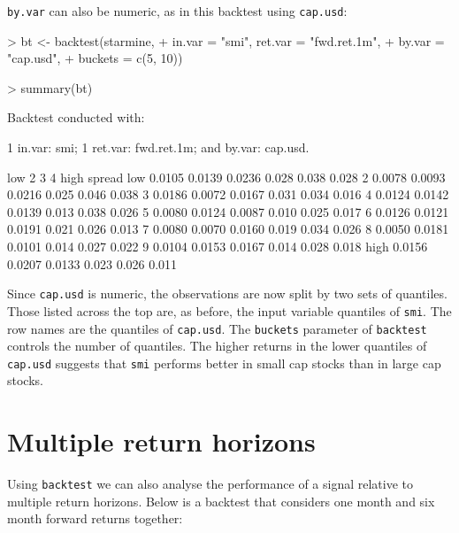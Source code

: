 \documentclass[a4paper]{report}
\begin{document}
\begin{article}
\texttt{by.var} can also be numeric, as in this backtest using
\texttt{cap.usd}:


\begin{Schunk}
\begin{Sinput}
> bt <- backtest(starmine, 
+     in.var = "smi", ret.var = "fwd.ret.1m", 
+     by.var = "cap.usd", 
+     buckets = c(5, 10))
\end{Sinput}
\end{Schunk}


\begin{Schunk}
\begin{Sinput}
> summary(bt)
\end{Sinput}
\begin{Soutput}
Backtest conducted with:

1 in.var: smi;
1 ret.var: fwd.ret.1m;
and by.var: cap.usd.

        low      2      3     4  high spread
low  0.0105 0.0139 0.0236 0.028 0.038  0.028
2    0.0078 0.0093 0.0216 0.025 0.046  0.038
3    0.0186 0.0072 0.0167 0.031 0.034  0.016
4    0.0124 0.0142 0.0139 0.013 0.038  0.026
5    0.0080 0.0124 0.0087 0.010 0.025  0.017
6    0.0126 0.0121 0.0191 0.021 0.026  0.013
7    0.0080 0.0070 0.0160 0.019 0.034  0.026
8    0.0050 0.0181 0.0101 0.014 0.027  0.022
9    0.0104 0.0153 0.0167 0.014 0.028  0.018
high 0.0156 0.0207 0.0133 0.023 0.026  0.011
\end{Soutput}
\end{Schunk}

Since \texttt{cap.usd} is numeric, the observations are now split by
two sets of quantiles.  Those listed across the top are, as before, the
input variable quantiles of \texttt{smi}.  The row names are the
quantiles of \texttt{cap.usd}.  The \texttt{buckets} parameter of
\texttt{backtest} controls the number of quantiles. The higher returns
in the lower quantiles of \texttt{cap.usd} suggests that \texttt{smi}
performs better in small cap stocks than in large cap stocks.

\section*{Multiple return horizons}

Using \texttt{backtest} we can also analyse the performance of a
signal relative to multiple return horizons.  Below is a backtest that
considers one month and six month forward returns together:



\end{article}
\end{document}

